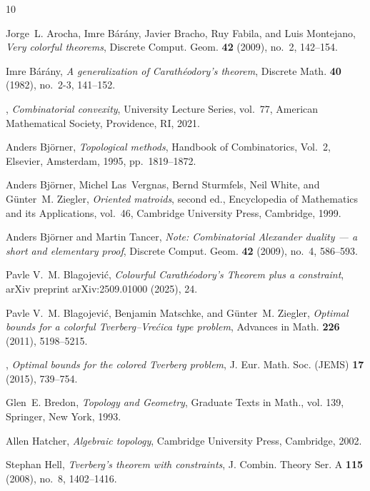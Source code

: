 \documentclass[a4paper,11pt,reqno, english]{amsart}
\theoremstyle{definition}
\theoremstyle{remark}
\begin{document}
\begin{small}
\begin{thebibliography}{10}

Jorge~L. Arocha, Imre B\'ar\'any, Javier Bracho, Ruy Fabila, and Luis
  Montejano, \emph{Very colorful theorems}, Discrete Comput. Geom. \textbf{42}
  (2009), no.~2, 142--154.

Imre B\'ar\'any, \emph{A generalization of {C}arath\'eodory's theorem},
  Discrete Math. \textbf{40} (1982), no.~2-3, 141--152.

\bysame, \emph{Combinatorial convexity}, University Lecture Series, vol.~77,
  American Mathematical Society, Providence, RI, 2021.

Anders Bj{\"o}rner, \emph{Topological methods}, Handbook of Combinatorics,
  {V}ol.\ 2, Elsevier, Amsterdam, 1995, pp.~1819--1872.

Anders Bj\"orner, Michel Las~Vergnas, Bernd Sturmfels, Neil White, and
  G\"unter~M. Ziegler, \emph{Oriented matroids}, second ed., Encyclopedia of
  Mathematics and its Applications, vol.~46, Cambridge University Press,
  Cambridge, 1999.

Anders Bj\"{o}rner and Martin Tancer, \emph{Note: {C}ombinatorial {A}lexander
  duality --- a short and elementary proof}, Discrete Comput. Geom. \textbf{42}
  (2009), no.~4, 586--593.

Pavle V.~M. Blagojevi\'c, \emph{{Colourful Carath\'eodory's Theorem plus a
  constraint}}, arXiv preprint arXiv:2509.01000 (2025), 24.

Pavle V.~M. Blagojevi\'c, Benjamin Matschke, and G\"unter~M. Ziegler,
  \emph{Optimal bounds for a colorful {T}verberg--{V}re\'cica type problem},
  Advances in Math. \textbf{226} (2011), 5198--5215.

\bysame, \emph{Optimal bounds for the colored {T}verberg problem}, J. Eur.
  Math. Soc. (JEMS) \textbf{17} (2015), 739--754.

Glen~E. Bredon, \emph{Topology and {G}eometry}, Graduate Texts in Math., vol.
  139, Springer, New York, 1993.

Allen Hatcher, \emph{Algebraic topology}, Cambridge University Press,
  Cambridge, 2002.

Stephan Hell, \emph{Tverberg's theorem with constraints}, J. Combin. Theory
  Ser. A \textbf{115} (2008), no.~8, 1402--1416.


\end{thebibliography}
\end{small}
\end{document}
